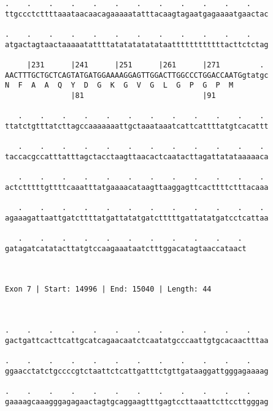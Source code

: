 \documentclass{article}
\begin{document}
\begin{Verbatim}
.    .    .    .    .    .    .    .    .    .    .    .    
ttgccctcttttaaataacaacagaaaaatatttacaagtagaatgagaaaatgaactac
                                                            
.    .    .    .    .    .    .    .    .    .    .    .    
atgactagtaactaaaaatattttatatatatatataattttttttttttacttctctag
                                                            
     |231      |241      |251      |261      |271         . 
AACTTTGCTGCTCAGTATGATGGAAAAGGAGTTGGACTTGGCCCTGGACCAATGgtatgc
N  F  A  A  Q  Y  D  G  K  G  V  G  L  G  P  G  P  M        
               |81                           |91            
  
   .    .    .    .    .    .    .    .    .    .    .    . 
ttatctgtttatcttagccaaaaaaattgctaaataaatcattcattttatgtcacattt
                                                            
   .    .    .    .    .    .    .    .    .    .    .    . 
taccacgccatttatttagctacctaagttaacactcaatacttagattatataaaaaca
                                                            
   .    .    .    .    .    .    .    .    .    .    .    . 
actctttttgttttcaaatttatgaaaacataagttaaggagttcacttttctttacaaa
                                                            
   .    .    .    .    .    .    .    .    .    .    .    . 
agaaagattaattgatcttttatgattatatgatctttttgattatatgatcctcattaa
                                                            
   .    .    .    .    .    .    .    .    .    .    . 
gatagatcatatacttatgtccaagaaataatctttggacatagtaaccataact
                                                       
                                                       
 
Exon 7 | Start: 14996 | End: 15040 | Length: 44



.    .    .    .    .    .    .    .    .    .    .    .    
gactgattcacttcattgcatcagaacaatctcaatatgcccaattgtgcacaactttaa
                                                            
.    .    .    .    .    .    .    .    .    .    .    .    
ggaacctatctgccccgtctaattctcattgatttctgttgataaggattgggagaaaag
                                                            
.    .    .    .    .    .    .    .    .    .    .    .    
gaaaagcaaagggagagaactagtgcaggaagtttgagtccttaaattcttccttgggag
                                                            

\end{Verbatim}
\end{document}
